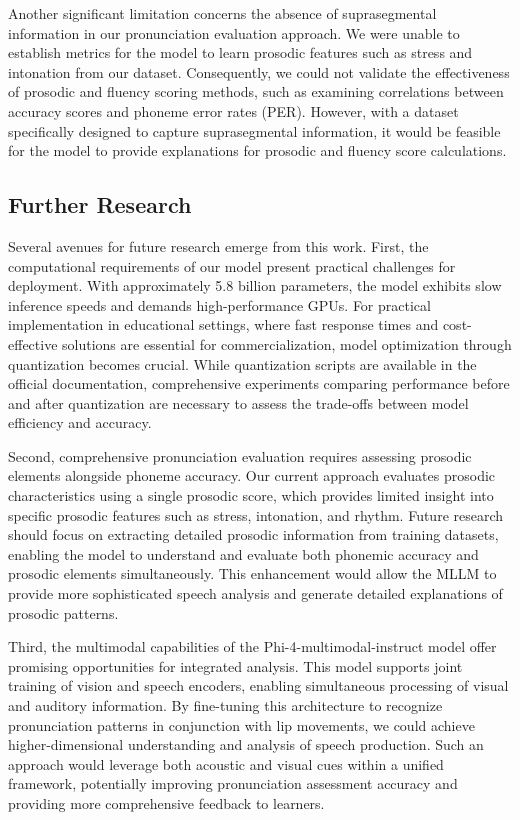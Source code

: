 \documentclass[sigconf,nonacm]{acmart}
\begin{document}
Another significant limitation concerns the absence of suprasegmental information in our pronunciation evaluation approach. We were unable to establish metrics for the model to learn prosodic features such as stress and intonation from our dataset. Consequently, we could not validate the effectiveness of prosodic and fluency scoring methods, such as examining correlations between accuracy scores and phoneme error rates (PER). However, with a dataset specifically designed to capture suprasegmental information, it would be feasible for the model to provide explanations for prosodic and fluency score calculations.

\subsection{Further Research}

Several avenues for future research emerge from this work. First, the computational requirements of our model present practical challenges for deployment. With approximately 5.8 billion parameters, the model exhibits slow inference speeds and demands high-performance GPUs. For practical implementation in educational settings, where fast response times and cost-effective solutions are essential for commercialization, model optimization through quantization becomes crucial. While quantization scripts are available in the official documentation, comprehensive experiments comparing performance before and after quantization are necessary to assess the trade-offs between model efficiency and accuracy.

Second, comprehensive pronunciation evaluation requires assessing prosodic elements alongside phoneme accuracy. Our current approach evaluates prosodic characteristics using a single prosodic score, which provides limited insight into specific prosodic features such as stress, intonation, and rhythm. Future research should focus on extracting detailed prosodic information from training datasets, enabling the model to understand and evaluate both phonemic accuracy and prosodic elements simultaneously. This enhancement would allow the MLLM to provide more sophisticated speech analysis and generate detailed explanations of prosodic patterns.

Third, the multimodal capabilities of the Phi-4-multimodal-instruct model \cite{abouelenin2025phi} offer promising opportunities for integrated analysis. This model supports joint training of vision and speech encoders, enabling simultaneous processing of visual and auditory information. 
By fine-tuning this architecture to recognize pronunciation patterns in conjunction with lip movements, we could achieve higher-dimensional understanding and analysis of speech production. Such an approach would leverage both acoustic and visual cues within a unified framework, potentially improving pronunciation assessment accuracy and providing more comprehensive feedback to learners.
\end{document}
